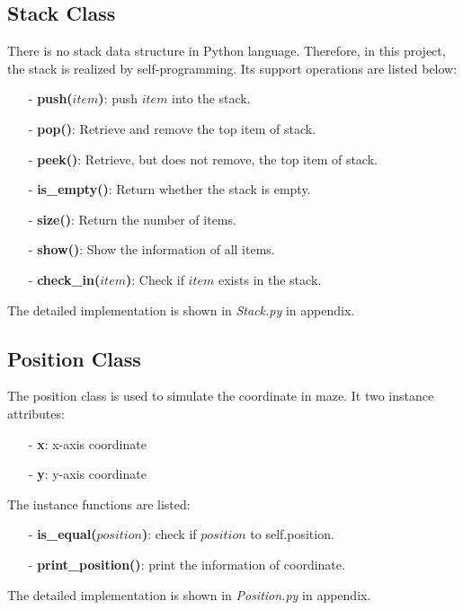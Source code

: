 \documentclass[11pt,times,oneside,openright,hardcopy]{eeereport}
\begin{document}
\subsection{Stack Class}
There is no stack data structure in Python language. Therefore, in this project, the stack is realized by self-programming.
Its support operations are listed below:
\begin{itemize}
    \item[-] \textbf{push($item$)}: \newline push $item$ into the stack.
    \item[-] \textbf{pop()}: \newline Retrieve and remove the top item of stack.
    \item[-] \textbf{peek()}: \newline Retrieve, but does not remove, the top item of stack.
    \item[-] \textbf{is\_empty()}: \newline Return whether the stack is empty.
    \item[-] \textbf{size()}: \newline Return the number of items.
    \item[-] \textbf{show()}: \newline Show the information of all items.
    \item[-] \textbf{check\_in($item$)}: \newline Check if $item$ exists in the stack.
\end{itemize}
The detailed implementation is shown in \textit{Stack.py} in appendix.

\subsection{Position Class}
The position class is used to simulate the coordinate in maze. 
It two instance attributes:
\begin{itemize}
    \item[-] \textbf{x}: x-axis coordinate
    \item[-] \textbf{y}: y-axis coordinate
\end{itemize}
The instance functions are listed:
\begin{itemize}
    \item[-] \textbf{is\_equal($position$)}: check if $position$ to self.position.
    \item[-] \textbf{print\_position()}: print the information of coordinate.
\end{itemize}
The detailed implementation is shown in \textit{Position.py} in appendix.
\end{document}
